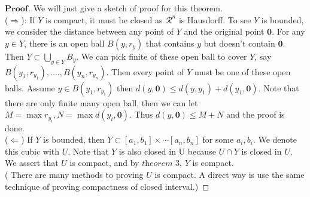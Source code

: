 \documentclass[a4paper, 11pt]{article}
\theoremstyle{definition}
\theoremstyle{remark}
\newenvironment{myprf}
{\renewcommand\qedsymbol{$ $}\begin{proof}[$\mathbf{Proof}$]}
  {\end{proof}}
\theoremstyle{definition}
\begin{document}
\begin{myprf}
        We will just give a sketch of proof for this theorem.\\
        ($\Rightarrow$): If $Y$ is compact, it must be closed as $\mathcal{R}^n$
        is Hausdorff. To see $Y$ is bounded, we consider the distance between any
        point of $Y$ and the original point $\mathbf{0}$. 
        For any $y\in Y$, there is an open
        ball $B(y, r_y)$ that contains $y$ but doesn't contain $\mathbf{0}$. Then 
        $Y\subset\bigcup_{y\in Y} B_y$. We can pick finite of these open ball to
        cover $Y$, say $B(y_1,r_{y_1}),....,B(y_n,r_{y_n})$. 
        Then every point of $Y$ must be
        one of these open balls. Assume $y\in B(y_1,r_{y_1})$ then 
        $d(y,\mathbf{0})\leq d(y, y_1)+d(y_1, \mathbf{0})$. Note that there are
        only finite many open ball, then we can let $M=\max r_{y_i}, N=
        \max d(y_i, \mathbf{0})$. Thus $d(y,\mathbf{0}) \leq M+N$ and the proof
        is done.\\
        \noindent
        ($\Leftarrow$) If $Y$ is bounded, then $Y\subset [a_1,b_1]\times\cdots
        [a_n,b_n]$ for some $a_i, b_i$. We denote this cubic with $U$.
        Note that $Y$ is also closed in U because $U\cap Y$ is closed in $U$.
        We assert that $U$ is compact, and by $\textit{theorem 3}$, $Y$
        is compact.\\
        ( There are many methods to proving $U$ is compact. A direct way
        is use the same technique of proving compactness of closed interval.)

\end{myprf}
\end{document}
